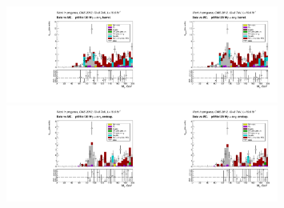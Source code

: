 \begin{figure}[htb]
  \begin{center}
    \includegraphics[width=0.40\textwidth]{../figs/figs_v11/ELECTRON_WGamma/PrepareYields/c_TotalDATAvsMC_Barrel__Mpholep1PRELIMINARY_FOR_E_TO_GAMMA_WITH_PSV_CUT_pt95to120_.pdf}\includegraphics[width=0.40\textwidth]{../figs/figs_v11/ELECTRON_WGamma/PrepareYields/c_TotalDATAvsMC_Barrel__Mpholep1PRELIMINARY_FOR_E_TO_GAMMA_WITH_PSV_CUT_pt95to120__etogScale.pdf}\\
    \includegraphics[width=0.40\textwidth]{../figs/figs_v11/ELECTRON_WGamma/PrepareYields/c_TotalDATAvsMC_Endcap__Mpholep1PRELIMINARY_FOR_E_TO_GAMMA_WITH_PSV_CUT_pt95to120_.pdf}\includegraphics[width=0.40\textwidth]{../figs/figs_v11/ELECTRON_WGamma/PrepareYields/c_TotalDATAvsMC_Endcap__Mpholep1PRELIMINARY_FOR_E_TO_GAMMA_WITH_PSV_CUT_pt95to120__etogScale.pdf}\\

\end{center}
\end{figure}

